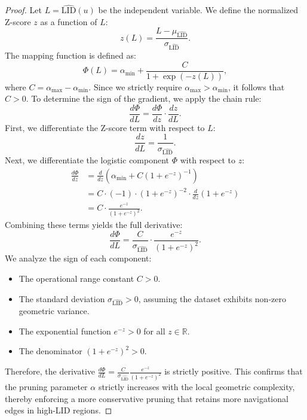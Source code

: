 \documentclass{article}
\theoremstyle{plain}
\theoremstyle{definition}
\theoremstyle{remark}
\begin{document}
\begin{proof}
Let $L = \widehat{\text{LID}}(u)$ be the independent variable. We define the normalized Z-score $z$ as a function of $L$:
\begin{equation}
    z(L) = \frac{L - \mu_{\widehat{\text{LID}}}}{\sigma_{\widehat{\text{LID}}}}.
\end{equation}
The mapping function is defined as:
\begin{equation}
    \Phi(L) = \alpha_{\min} + \frac{C}{1 + \exp(-z(L))},
\end{equation}
where $C = \alpha_{\max} - \alpha_{\min}$. Since we strictly require $\alpha_{\max} > \alpha_{\min}$, it follows that $C > 0$.
To determine the sign of the gradient, we apply the chain rule:
\begin{equation}
    \frac{d \Phi}{d L} = \frac{d \Phi}{d z} \cdot \frac{d z}{d L}.
\end{equation}
First, we differentiate the Z-score term with respect to $L$:
\begin{equation}
    \frac{d z}{d L} = \frac{1}{\sigma_{\widehat{\text{LID}}}}.
\end{equation}
Next, we differentiate the logistic component $\Phi$ with respect to $z$:
\begin{align}
    \frac{d \Phi}{d z} &= \frac{d}{d z} \left( \alpha_{\min} + C (1 + e^{-z})^{-1} \right) \\
    &= C \cdot (-1) \cdot (1 + e^{-z})^{-2} \cdot \frac{d}{d z}(1 + e^{-z}) \\
    &= C \cdot \frac{e^{-z}}{(1 + e^{-z})^2}.
\end{align}
Combining these terms yields the full derivative:
\begin{equation}
    \frac{d \Phi}{d L} = \frac{C}{\sigma_{\widehat{\text{LID}}}} \cdot \frac{e^{-z}}{(1 + e^{-z})^2}.
\end{equation}
We analyze the sign of each component:
\begin{itemize}
    \item The operational range constant $C > 0$.
    \item The standard deviation $\sigma_{\widehat{\text{LID}}} > 0$, assuming the dataset exhibits non-zero geometric variance.
    \item The exponential function $e^{-z} > 0$ for all $z \in \mathbb{R}$.
    \item The denominator $(1 + e^{-z})^2 > 0$.
\end{itemize}
Therefore, the derivative $\frac{d \Phi}{d L} = \frac{C}{\sigma_{\widehat{\text{LID}}}} \frac{e^{-z}}{(1 + e^{-z})^2}$ is strictly positive.
This confirms that the pruning parameter $\alpha$ strictly increases with the local geometric complexity, thereby enforcing a more conservative pruning that retains more navigational edges in high-LID regions.
\end{proof}
\end{document}
